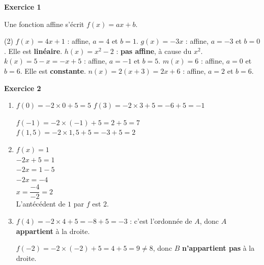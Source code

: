 \documentclass[a4paper,11pt]{article}
\newenvironment{exercice}[1]{%
  \Needspace{6\baselineskip}\par\bigskip\noindent\textbf{Exercice #1}\par\smallskip\noindent\ignorespaces
}{%
  \par
}
\begin{document}
\pagestyle{fancy}
\fancyhf{}
\fancyhead[L]{\Niveau}
\fancyhead[C]{\ChapitreCourt}
\fancyhead[R]{\Document}
\fancyfoot[R]{\thepage\ / \pageref{LastPage}}

\begin{exercice}{1}
Une fonction affine s'écrit $f(x)=ax+b$.
\begin{tasks}(2)
\task $f(x)=4x+1$ : affine, $a=4$ et $b=1$.
\task $g(x)=-3x$ : affine, $a=-3$ et $b=0$. Elle est \textbf{linéaire}.
\task $h(x)=x^2-2$ : \textbf{pas affine}, à cause du $x^2$.
\task $k(x)=5-x=-x+5$ : affine, $a=-1$ et $b=5$.
\task $m(x)=6$ : affine, $a=0$ et $b=6$. Elle est \textbf{constante}.
\task $n(x)=2(x+3)=2x+6$ : affine, $a=2$ et $b=6$.
\end{tasks}
\end{exercice}

\begin{exercice}{2}
\begin{enumerate}[label=\arabic*.]
\item $f(0)=-2\times 0+5=5$ \qquad $f(3)=-2\times 3+5=-6+5=-1$

$f(-1)=-2\times(-1)+5=2+5=7$ \qquad $f(1{,}5)=-2\times 1{,}5+5=-3+5=2$
\item $f(x)=1$\\
$-2x+5=1$\\
$-2x=1-5$\\
$-2x=-4$\\
$x=\dfrac{-4}{-2}=2$\\
L'antécédent de $1$ par $f$ est $2$.
\item $f(4)=-2\times 4+5=-8+5=-3$ : c'est l'ordonnée de $A$, donc $A$ \textbf{appartient} à la droite.

$f(-2)=-2\times(-2)+5=4+5=9\neq 8$, donc $B$ \textbf{n'appartient pas} à la droite.
\end{enumerate}
\end{exercice}
\end{document}
